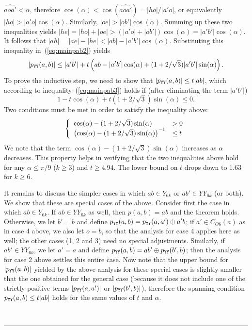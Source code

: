 \documentclass[11pt]{article}
\newcommand\cone{{C}}
\newcommand\pyy{p_{{\tt YY}}}
\newcommand\ang[1]{\widehat{#1}}
\newcommand{\qed}{\rule{0.5em}{1.5ex}}
\newcommand{\fqed}{{\hfill~\qed}}
\newenvironment{proof}{{\noindent \bf Proof.}}
                      {{\hfill \fqed} \vspace{1em}}
\begin{document}
\begin{proof}
$\ang{aoa'} < \alpha$, therefore $\cos(\alpha) < \cos(\ang{aoa'}) = |ho|/|a'o|$, or equivalently $|ho| > |a'o|\cos(\alpha)$. Similarly,
$|oe| > |ob'|\cos(\alpha)$. Summing up these two inequalities yields $|he| = |ho|+|oe| > (|a'o|+|ob'|)\cos(\alpha) = |a'b'|\cos(\alpha)$. It follows that $|ah| = |ae| - |he| < |ab| - |a'b'|\cos(\alpha)$. Substituting this inequality in~(\ref{eq:mainpab2}) yields
\begin{equation}
|\pyy(a,b)| \le |a'b'| + t\left(ab - |a'b'|\cos(\alpha) + (1+2/\sqrt{3})|a'b'|\sin(\alpha)\right).
\label{eq:mainpab3}
\end{equation}
To prove the inductive step, we need to show that $|\pyy(a,b)| \le t|ab|$, which according to inequality~(\ref{eq:mainpab3}) holds if (after eliminating the term $|a'b'|$)
\[
1 - t\cos(\alpha) + t(1+2/\sqrt{3})\sin(\alpha) \le 0.
\]
Two conditions must be met in order to satisfy the inequality above:
\[
  \left\{
  \begin{array}{l l}
   \cos(\alpha) - (1+2/\sqrt{3})\sin(\alpha) & > 0 \\
   \left(\cos(\alpha) - (1+2/\sqrt{3})\sin(\alpha)\right)^{-1} & \le t\\
\end{array} \right.
\]
We note that the term $\cos(\alpha) - (1+2/\sqrt{3})\sin(\alpha)$ increases as $\alpha$ decreases. This property helps in verifying that the two inequalities above hold for any $\alpha \le \pi/9$ ($k \ge 3$) and $t \ge 4.94$. The lower bound on $t$ drops down to $1.63$ for $k \ge 6$.

\medskip
\noindent
It remains to discuss the simpler cases in which $ab \in Y_{6k}$ or $ab' \in YY_{6k}$ (or both). We show that these are special cases of the above. Consider first the case in which $ab \in Y_{6k}$. If $ab \in YY_{6k}$ as well, then $p(a, b) = ab$ and the theorem holds. Otherwise, we let $b' = b$ and define $\pyy(a, b) = \pyy(a, a') \oplus a'b$; if $a' \in \cone_{\Theta6}(a)$ as in case 4 above, we also let $o = b$, so that the analysis for case 4 applies here as well; the other cases (1, 2 and 3) need no special adjustments. Similarly, if $ab' \in YY_{6k}$, we let $a'=a$ and define $\pyy(a, b) = ab' \oplus  \pyy(b', b)$; then the analysis for case 2 above settles this entire case.  Now note that the upper bound for $|\pyy(a,b)|$ yielded by the above analysis for these special cases is slightly smaller that the one obtained for the general case (because it does not include one of the strictly positive terms $|\pyy(a, a')|$ or $|\pyy(b', b)|$), therefore the spanning condition $\pyy(a, b) \le t|ab|$ holds for the same values of $t$ and $\alpha$.
\end{proof}
\end{document}
